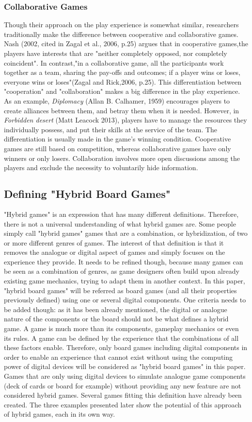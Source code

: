 \subsubsection{Collaborative Games}
Though their approach on the play experience is somewhat similar, researchers traditionally make the difference between cooperative and collaborative games. Nash (2002, cited in Zagal et al., 2006, p.25) argues that in cooperative games,the players have interests that are "neither completely opposed, nor completely coincident". In contrast,"in a collaborative game, all the participants work together as a team, sharing the pay-offs and outcomes; if a player wins or loses, everyone wins or loses"(Zagal and Rick,2006, p.25). This differentiation between "cooperation" and "collaboration" makes a big difference in the play experience. As an example, \textit{Diplomacy} (Allan B. Calhamer, 1959) encourages players to create alliances between them, and betray them when it is needed. However, in \textit{Forbidden desert} (Matt Leacock 2013), players have to manage the resources they individually possess, and put their skills at the service of the team. 
The differentiation is usually made in the game's winning condition. Cooperative games are still based on competition, whereas collaborative games have only winners or only losers. Collaboration involves more open discussions among the players and exclude the necessity to voluntarily hide information. 
\subsection{Defining "Hybrid Board Games"}
"Hybrid games" is an expression that has many different definitions. Therefore, there is not a universal understanding of what hybrid games are. Some people simply call "hybrid games" games that are a combination, or hybridization, of two or more different genres of games. The interest of that definition is that it removes the analogue or digital aspect of games and simply focuses on the experience they provide. It needs to be refined though, because many games can be seen as a combination of genres, as game designers often build upon already existing game mechanics, trying to adapt them in another context. In this paper, "hybrid board games" will be referred as board games (and all their properties previously defined) using one or several digital components. One criteria needs to be added though: as it has been already mentioned, the digital or analogue nature of the components or the board should not be what defines a hybrid game. A game is much more than its components, gameplay mechanics or even its rules. A game can be defined by the experience that the combinations of all these factors enable. Therefore, only board games including digital components in order to enable an experience that cannot exist without using the computing power of digital devices will be considered as "hybrid board games" in this paper. Games that are only using digital devices to simulate analogue game components (deck of cards or board for example) without providing any new feature are not considered hybrid games. Several games fitting this definition have already been created. The three examples presented later show the potential of this approach of hybrid games, each in its own way.
